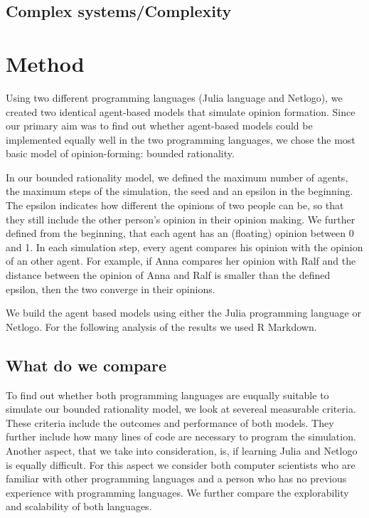 \documentclass[runningheads]{llncs}
\begin{document}
\hypertarget{complex-systemscomplexity}{%
\subsection{Complex
systems/Complexity}\label{complex-systemscomplexity}}

\hypertarget{method}{%
\section{Method}\label{method}}

Using two different programming languages (Julia language and Netlogo),
we created two identical agent-based models that simulate opinion
formation. Since our primary aim was to find out whether agent-based
models could be implemented equally well in the two programming
languages, we chose the most basic model of opinion-forming: bounded
rationality.

In our bounded rationality model, we defined the maximum number of
agents, the maximum steps of the simulation, the seed and an epsilon in
the beginning. The epsilon indicates how different the opinions of two
people can be, so that they still include the other person's opinion in
their opinion making. We further defined from the beginning, that each
agent has an (floating) opinion between 0 and 1. In each simulation
step, every agent compares his opinion with the opinion of an other
agent. For example, if Anna compares her opinion with Ralf and the
distance between the opinion of Anna and Ralf is smaller than the
defined epsilon, then the two converge in their opinions.

We build the agent based models using either the Julia programming
language or Netlogo. For the following analysis of the results we used R
Markdown.

\hypertarget{what-do-we-compare}{%
\subsection{What do we compare}\label{what-do-we-compare}}

To find out whether both programming languages are euqually suitable to
simulate our bounded rationality model, we look at severeal measurable
criteria. These criteria include the outcomes and performance of both
models. They further include how many lines of code are necessary to
program the simulation. Another aspect, that we take into consideration,
is, if learning Julia and Netlogo is equally difficult. For this aspect
we consider both computer scientists who are familiar with other
programming languages and a person who has no previous experience with
programming languages. We further compare the explorability and
scalability of both languages.
\end{document}
